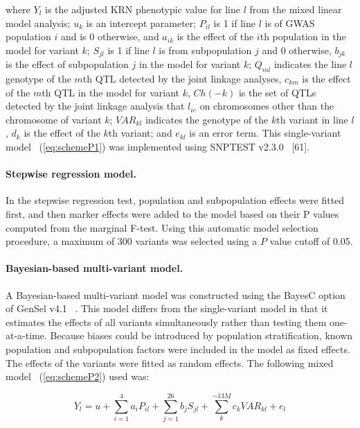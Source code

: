 \documentclass[10pt,letterpaper]{article}
\begin{document}
where $Y_l$ is the adjusted KRN phenotypic value for line $l$ from the mixed linear model analysis; $u_k$ is an intercept parameter; $P_{il}$ is 1 if line $l$ is of GWAS population $i$ and is 0 otherwise, and $a_{ik}$ is the effect of the $i$th population in the model for variant $k$; $S_{jl}$ is 1 if line $l$ is from subpopulation $j$ and 0 otherwise, $b_{jk}$ is the effect of subpopulation $j$ in the model for variant $k$; $Q_{ml}$ indicates the line $l$ genotype of the $m$th QTL detected by the joint linkage analyses, $c_{km}$ is the effect of the $m$th QTL in the model for variant $k$, $Ch(-k)$ is the set of QTLs detected by the joint linkage analysis that $l_{ie}$ on chromosomes other than the chromosome of variant $k$; $VAR_{kl}$ indicates the genotype of the $k$th variant in line $l$, $d_k$ is the effect of the $k$th variant; and $e_{kl}$ is an error term. This single-variant model ~(\ref{eq:schemeP1}) was implemented using SNPTEST v2.3.0 ~\cite{Marchini2010}[61].

\paragraph{Stepwise regression model.} 
In the stepwise regression test, population and subpopulation effects were fitted first, and then marker effects were added to the model based on their P values computed from the marginal F-test. Using this automatic model selection procedure, a maximum of 300 variants was selected using a $P$ value cutoff of 0.05.

\paragraph{Bayesian-based multi-variant model.} 
A Bayesian-based multi-variant model was constructed using the BayesC option of GenSel v4.1 ~\cite{Habier2011}. This model differs from the single-variant model in that it estimates the effects of all variants simultaneously rather than testing them one-at-a-time. Because biases could be introduced by population stratification, known population and subpopulation factors were included in the model as fixed effects. The effects of the variants were fitted as random effects. The following mixed model ~(\ref{eq:schemeP2}) used was:  

\begin{equation}\label{eq:schemeP2} 
Y_l = u + \sum_{i=1}^{4}a_{i}P_{il} + \sum_{j=1}^{26} b_{j}S_{jl} + \sum_k^{\sim 13M}c_k VAR_{kl} + e_l
\end{equation}
\end{document}
